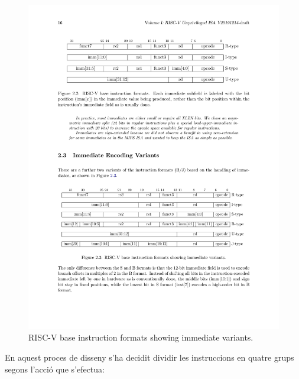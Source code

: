 \documentclass[10pt,a4paper,twocolumn,twoside]{article}
\begin{document}
        \begin{figure}[!h]
        \centering
        	\includegraphics[width=\linewidth]{pdf/Encoding.pdf}
            \caption{RISC-V base instruction formats showing immediate variants.}
            \label{fig:baseinstformatsimm}
        \end{figure}
        
        En aquest proces de disseny s'ha decidit dividir les instruccions en quatre grups segons l'acció que s'efectua:
        
\end{document}
